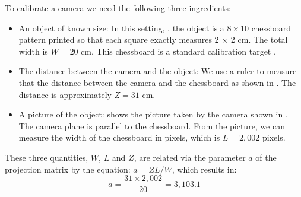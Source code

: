 To calibrate a camera we need the following three ingredients: 
\begin{itemize}
\item An object of known size: In this setting, , the object is a $8\times10$ chessboard pattern printed so that each square exactly measures 2 $\times$ 2 cm. The total width is $W=20$ cm. This chessboard is a standard calibration target \cite{Zhang1999}. 
\item The distance between the camera and the object: We use a ruler to measure that the distance between the camera and the chessboard as shown in . The distance is approximately $Z=31$ cm.
\item A picture of the object:  shows the picture taken by the camera shown in . The camera plane is parallel to the chessboard. From the picture, we can measure the width of the chessboard in pixels, which is $L=2{,}002$ pixels. 
\end{itemize}
These three quantities, $W$, $L$ and $Z$, are related via the parameter $a$ of the projection matrix by the equation: $a= Z L/W$, which results in:
\begin{equation}
a = \frac{31 \times 2{,}002}{20} = 3{,}103.1
\end{equation}









